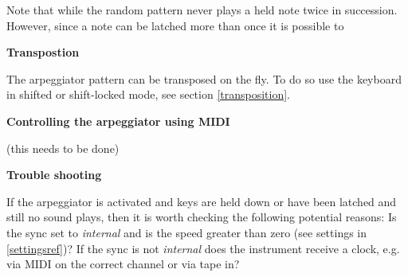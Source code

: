 Note that while the random pattern never plays a held note twice in succession. However, since a note can be latched more than once it is possible to 

\textbf{Transpostion}

The arpeggiator pattern can be transposed on the fly. To do so use the keyboard in shifted or shift-locked mode, see section \ref{transposition}.

\textbf{Controlling the arpeggiator using MIDI}

(this needs to be done)


\textbf{Trouble shooting}

If the arpeggiator is activated and keys are held down or have been latched and still no sound plays, then it is worth checking the following potential reasons: Is the sync set to \textit{internal} and is the speed greater than zero (see settings in \ref{settingsref})? If the sync is not \textit{internal} does the instrument receive a clock, e.g. via MIDI on the correct channel or via tape in?
